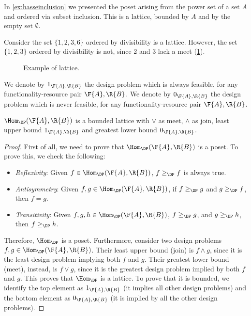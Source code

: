 \begin{example}
    In \cref{ex:hasseinclusion} we presented the poset arising from the power set of a set $A$ and ordered via subset inclusion. This is a lattice, bounded by $A$ and by the empty set $\emptyset$. 
\end{example}

\begin{example}
Consider the set $\{1,2,3,6\}$ ordered by divisibility is a lattice. However, the set $\{1,2,3\}$ ordered by divisibility is not, since 2 and 3 lack a meet (\cref{fig:exlattice}).
\begin{figure}[h!]
\begin{center}
\end{center}
\caption{Example of lattice. \label{fig:exlattice}}
\end{figure}
\end{example}

\begin{remark}
We denote by $1_{\F{A},\R{B}}$ the design problem which is always feasible, for any functionality-resource pair $\F{A},\R{B}$. We denote by $0_{\F{A},\R{B}}$ the design problem which is never feasible, for any functionality-resource pair $\F{A},\R{B}$.
\end{remark}
\begin{lemma}
\label{lemma:dpboundedlattice}
$\Hom_\DP(\F{A},\R{B})$ is a bounded lattice with $\vee$ as meet, $\wedge$ as join, least upper bound  $1_{\F{A},\R{B}}$ and greatest lower bound $0_{\F{A},\R{B}}$.
\end{lemma}

\begin{proof}
First of all, we need to prove that $\Hom_\DP(\F{A},\R{B})$ is a poset. To prove this, we check the following:

\begin{itemize}
    \item \emph{Reflexivity}: Given $f\in \Hom_\DP(\F{A},\R{B})$, $f\geq_\DP f$ is always true.
    \item \emph{Antisymmetry}: Given $f,g\in \Hom_\DP(\F{A},\R{B})$, if $f\geq_\DP g$ and $g\geq_\DP f$, then $f=g$.
    \item \emph{Transitivity}: Given $f,g,h\in \Hom_\DP(\F{A},\R{B})$, $f\geq_\DP g$, and $g\geq_\DP h$, then $f\geq_\DP h$.
\end{itemize}
Therefore, $\Hom_\DP$ is a poset. Furthermore, consider two design problems $f,g\in \Hom_\DP(\F{A},\R{B})$. Their least upper bound (join) is $f\wedge g$, since it is the least design problem implying both $f$ and $g$. Their greatest lower bound (meet), instead, is $f\vee g$, since it is the greatest design problem implied by both $f$ and $g$. This proves that $\Hom_\DP$ is a lattice. To prove that it is bounded, we identify the top element as $1_{\F{A},\R{B}}$ (it implies all other design problems) and the bottom element as $0_{\F{A},\R{B}}$ (it is implied by all the other design problems).
\end{proof}

